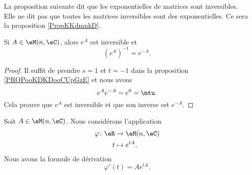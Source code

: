 La proposition suivante dit que les exponentielles de matrices sont inversibles. Elle ne dit pas que toutes les matrices inversibles sont des exponentielles. Ce sera la proposition \ref{PropKKdmnkD}.
\begin{proposition}       \label{PROPooRERRooMutKcg}
	Si \( A\in \eM(n,\eC)\), alors \(  e^{A}\) est inversible et
	\begin{equation}
		( e^{A})^{-1}= e^{-A}.
	\end{equation}
\end{proposition}

\begin{proof}
	Il suffit de prendre \( s=1\) et \( t=-1\) dans la proposition \ref{PROPooKDKDooCUpGzE} et nous avons
	\begin{equation}
		e^{A} e^{-A}= e^{0}=\mtu.
	\end{equation}
	Cela prouve que \(  e^{A}\) est inversible et que son inverse est \(  e^{-A}\).
\end{proof}

\begin{proposition}       \label{PROPooSDNNooQtHkhA}
	Soit \( A\in \eM(n,\eC)\). Nous considérons l'application
	\begin{equation}
		\begin{aligned}
			\varphi\colon \eR & \to \eM(n,\eC)   \\
			t                 & \mapsto  e^{tA}.
		\end{aligned}
	\end{equation}
	Nous avons la formule de dérivation
	\begin{equation}
		\varphi'(t)=A e^{tA}.
	\end{equation}
\end{proposition}

